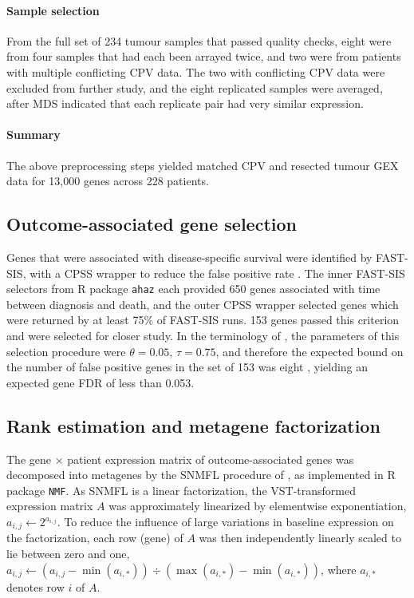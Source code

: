 \documentclass[thesis.tex]{subfiles}
\begin{document}
\paragraph{Sample selection}  From the full set of 234 tumour samples that passed quality checks, eight were from four samples that had each been arrayed twice, and two were from patients with multiple conflicting \gls{CPV} data.  The two with conflicting \gls{CPV} data were excluded from further study, and the eight replicated samples were averaged, after \gls{MDS} indicated that each replicate pair had very similar expression.

\paragraph{Summary}
The above preprocessing steps yielded matched \gls{CPV} and resected tumour \gls{GEX} data for 13,000 genes across 228 patients.

\subsection{Outcome-associated gene selection}
Genes that were associated with disease-specific survival were identified by \gls{FAST}-\gls{SIS}\cite{Gorst-Rasmussen2013}, with a \gls{CPSS} wrapper to reduce the false positive rate \cite{Shah2013}.  The inner \gls{FAST}-\gls{SIS} selectors from R package \texttt{ahaz} each provided 650 genes associated with time between diagnosis and death, and the outer \gls{CPSS} wrapper selected genes which were returned by at least 75\% of \gls{FAST}-\gls{SIS} runs.  153 genes passed this criterion and were selected for closer study.  
In the terminology of \cite{Shah2013}, the parameters of this selection procedure were $\theta = 0.05$, $\tau = 0.75$, and therefore the expected bound on the number of false positive genes in the set of 153 was eight \cite[table 1]{Shah2013}, yielding an expected gene \gls{FDR} of less than 0.053.

\subsection{Rank estimation and metagene factorization}
The gene $\times$ patient expression matrix of outcome-associated genes was decomposed into metagenes by the \gls{SNMFL} procedure of \cite{Kim2007}, as implemented in R package \texttt{NMF}.  As \gls{SNMFL} is a linear factorization, the \gls{VST}-transformed expression matrix $A$ was approximately linearized by elementwise exponentiation, $a_{i,j} \leftarrow 2^{a_{i,j}}$.  To reduce the influence of large variations in baseline expression on the factorization, each row (gene) of $A$ was then independently linearly scaled to lie between zero and one, $a_{i,j} \leftarrow (a_{i,j} - \min(a_{i,*})) \div (\max(a_{i,*}) - \min(a_{i,*}))$, where $a_{i,*}$ denotes row $i$ of $A$.
\end{document}
